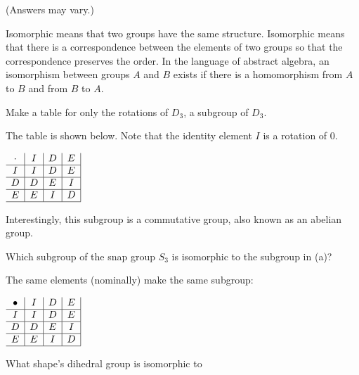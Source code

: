 \documentclass[../gatm_answers.tex]{subfiles}
\begin{document}
(Answers may vary.)

Isomorphic means that two groups have the same structure.
Isomorphic means that there is a correspondence between the elements of two groups so that the correspondence preserves the order.
In the language of abstract algebra, an isomorphism between groups $A$ and $B$ exists if there is a homomorphism from $A$ to $B$ and from $B$ to $A$.

\begin{outer_problem}
\item
\end{outer_problem}

\begin{inner_problem}[start=1]
\item Make a table for only the rotations of $D_3$, a subgroup of $D_3$.
\end{inner_problem}

The table is shown below. Note that the identity element $I$ is a rotation of $0$.
\begin{center}
$\begin{array}{c|c|c|c|}
\cdot & I & D & E \\ \hline
I & I & D & E \\ \hline
D & D & E & I \\ \hline
E & E & I & D \\ \hline
\end{array}$
\end{center}

Interestingly, this subgroup is a commutative group, also known as an abelian group.

\begin{inner_problem}
\item Which subgroup of the snap group $S_3$ is isomorphic to the subgroup in (a)?
\end{inner_problem}

The same elements (nominally) make the same subgroup:
\begin{center}
$\begin{array}{c|c|c|c|}
\bullet & I & D & E \\ \hline
I & I & D & E \\ \hline
D & D & E & I \\ \hline
E & E & I & D \\ \hline
\end{array}$
\end{center}

\begin{outer_problem}
\item What shape's dihedral group is isomorphic to
\end{outer_problem}
\end{document}
